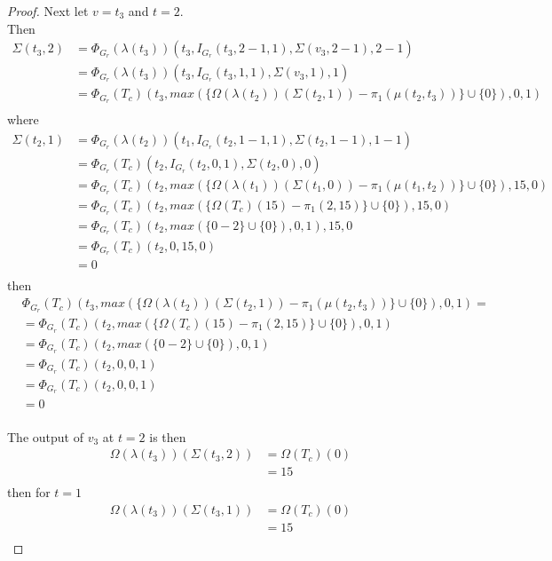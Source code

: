 \documentclass{article}
\begin{document}
\begin{proof}
	Next let \(v = t_{3}\) and \(t = 2\). \\
	Then 
	\begin{align*}
		\Sigma(t_{3}, 2) &= \Phi_{G_{r}}(\lambda(t_{3}))(t_{3}, I_{G_{r}}(t_{3}, 2 - 1, 1), \Sigma(v_{3}, 2 - 1), 2 - 1)\\
						 &= \Phi_{G_{r}}(\lambda(t_{3}))(t_{3}, I_{G_{r}}(t_{3}, 1, 1), \Sigma(v_{3}, 1), 1) \\
						 &= \Phi_{G_{r}}(T_{c})(t_{3}, max(\{\Omega(\lambda(t_{2}))(\Sigma(t_{2}, 1)) - \pi_{1}(\mu(t_{2}, t_{3}))\} \cup \{0\}), 0, 1) \\
	\end{align*}
	where 
	\begin{align*}
		\Sigma(t_{2}, 1) &= \Phi_{G_{r}}(\lambda(t_{2}))(t_{1}, I_{G_{r}}(t_{2}, 1 - 1, 1), \Sigma(t_{2}, 1 - 1), 1 - 1) \\ 
						 &= \Phi_{G_{r}}(T_{c})(t_{2}, I_{G_{r}}(t_{2}, 0, 1), \Sigma(t_{2}, 0), 0) \\
						 &= \Phi_{G_{r}}(T_{c})(t_{2}, max(\{\Omega(\lambda(t_{1}))(\Sigma(t_{1}, 0)) - \pi_{1}(\mu(t_{1}, t_{2}))\} \cup \{0\}), 15, 0) \\
						 &= \Phi_{G_{r}}(T_{c})(t_{2}, max(\{\Omega(T_{c})(15) - \pi_{1}(2, 15)\} \cup \{0\}), 15, 0) \\
						 &= \Phi_{G_{r}}(T_{c})(t_{2}, max(\{0 - 2\} \cup \{0\}), 0, 1), 15, 0\\
						 &= \Phi_{G_{r}}(T_{c})(t_{2}, 0, 15, 0) \\
						 &= 0 \\
	\end{align*}
	then 
	\begin{align*}
		&\Phi_{G_{r}}(T_{c})(t_{3}, max(\{\Omega(\lambda(t_{2}))(\Sigma(t_{2}, 1)) - \pi_{1}(\mu(t_{2}, t_{3}))\} \cup \{0\}), 0, 1) = \\
																		   &= \Phi_{G_{r}}(T_{c})(t_{2}, max(\{\Omega(T_{c})(15) - \pi_{1}(2, 15)\} \cup \{0\}), 0, 1)\\
																		   &= \Phi_{G_{r}}(T_{c})(t_{2}, max(\{0 - 2\} \cup \{0\}), 0, 1)\\
																		   &= \Phi_{G_{r}}(T_{c})(t_{2}, 0, 0, 1)\\
																		   &= \Phi_{G_{r}}(T_{c})(t_{2}, 0, 0, 1)\\
																		   &= 0\\
	\end{align*}

	The output of \(v_{3}\) at \(t = 2\) is then 
	\begin{align*}
		\Omega(\lambda(t_{3}))(\Sigma(t_{3}, 2)) &= \Omega(T_{c})(0) \\
		& = 15 \\ 
	\end{align*}
	then for \(t = 1\)
	\begin{align*}
		\Omega(\lambda(t_{3}))(\Sigma(t_{3}, 1)) &= \Omega(T_{c})(0) \\
		& = 15 \\ 
	\end{align*}


\end{proof}
\end{document}
